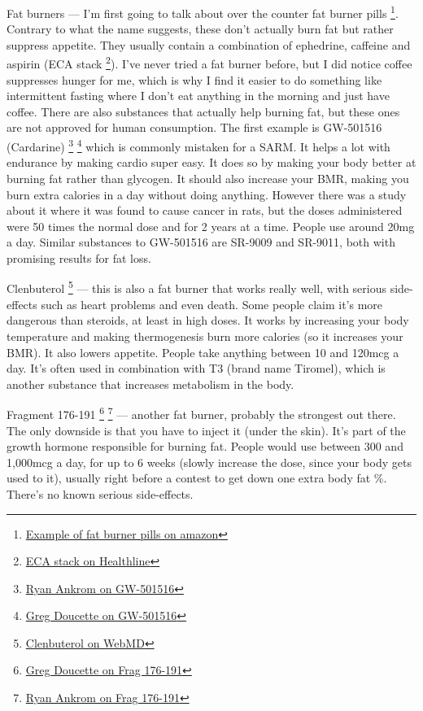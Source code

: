 \documentclass[openany, 12pt]{book}
\begin{document}
        Fat burners --- I'm first going to talk about over the counter fat burner pills
        \footnote{\href{https://www.amazon.co.uk/Bullets-K-CYTRO-Weight-Management-Supplement/dp/B08N43P8S3/}{Example of fat burner pills on amazon}}.
        Contrary to what the name suggests, these don't actually burn fat but rather suppress appetite. They usually contain a combination of ephedrine, caffeine and
        aspirin (ECA stack
        \footnote{\href{https://www.healthline.com/health/eca-stack}{ECA stack on Healthline}}). I've never tried a fat burner before, but I did notice coffee suppresses hunger for me,
        which is why I find it easier to do something like intermittent fasting where I don't eat anything in the morning and just have coffee.
        There are also substances that actually help burning fat, but these ones are not approved for human consumption. The first example is GW-501516 (Cardarine)
        \footnote{\href{https://www.youtube.com/watch?v=XrNZIO2k06I}{Ryan Ankrom on GW-501516}}
        \footnote{\href{https://www.youtube.com/watch?v=dbBOWljeLiw}{Greg Doucette on GW-501516}}
        which is commonly mistaken for a SARM. It helps a lot with endurance by making cardio super easy.
        It does so by making your body better at burning fat
        rather than glycogen. It should also increase your BMR, making you burn extra calories in a day without doing anything.
        However there was a study about it where it was found to cause cancer in rats, but the doses administered were 50 times the normal dose and for 2 years at a time.
        People use around 20mg a day. Similar substances to GW-501516 are SR-9009 and SR-9011, both with promising results for fat loss.

        Clenbuterol
        \footnote{\href{https://www.webmd.com/pain-management/what-you-need-to-know-about-clenbuterol-for-bodybuilding}{Clenbuterol on WebMD}}
        --- this is also a fat burner that works really well, with serious side-effects such as heart problems and even death.
        Some people claim it's more dangerous than steroids, at least in high doses.
        It works by increasing your body temperature and making thermogenesis burn more calories (so it increases your BMR).
        It also lowers appetite. People take anything between 10 and 120mcg a day. It's often used in combination with T3 (brand name Tiromel),
        which is another substance that increases metabolism in the body. 

        Fragment 176-191
        \footnote{\href{https://www.youtube.com/watch?v=8Hp1ExYShKI}{Greg Doucette on Frag 176-191}}
        \footnote{\href{https://www.youtube.com/watch?v=e4pnPjw2exE}{Ryan Ankrom on Frag 176-191}}
        --- another fat burner, probably the strongest out there. The only downside is that you have to inject it (under the skin).
        It's part of the growth hormone responsible for burning fat. People would use between 300 and 1,000mcg a day, for up to 6 weeks (slowly increase the dose, since
        your body gets used to it), usually right before a contest to get down one extra body fat \%. There's no known serious side-effects.        
\end{document}
